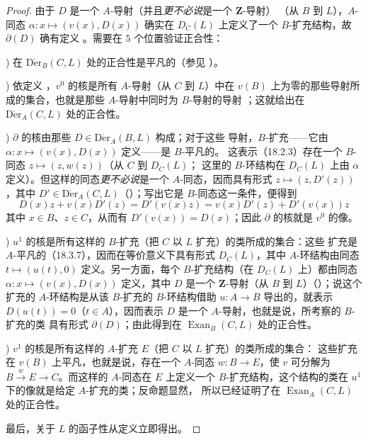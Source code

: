 \begin{proof}
由于 $D$ 是一个 $A$-导射（并且\emph{更不必说}是一个 $\mathbf{Z}$-导射）
（从 $B$ 到 $L$），$A$-同态 $\alpha:x\mapsto(v(x),D(x))$ 确实在
$D_C(L)$ 上定义了一个 $B$-扩充结构，故 $\partial(D)$ 确有定义
。需要在 $5$ 个位置验证正合性：

\medskip
{})\enspace
在 $\operatorname{D\acute{e}r}_B(C,L)$ 处的正合性是平凡的（参见
）。

\medskip
{})\enspace
依定义 ，$v^0$ 的核是所有 $A$-导射（从 $C$ 到 $L$）中在
$v(B)$ 上为零的那些导射所成的集合，也就是那些 $A$-导射中同时为 $B$-导射的导射
；这就给出在 $\operatorname{D\acute{e}r}_A(C,L)$ 处的正合性。

\medskip
{})\enspace
$\partial$ 的核由那些 $D\in\operatorname{D\acute{e}r}_A(B,L)$ 构成；对于这些
导射，$B$-扩充——它由 $\alpha:x\mapsto(v(x),D(x))$ 定义——是 $B$-平凡的。
这表示（18.2.3）存在一个 $B$-同态 $z\mapsto(z,w(z))$（从 $C$ 到 $D_C(L)$；
这里的 $B$-环结构在 $D_C(L)$ 上由 $\alpha$ 定义）。但这样的同态\emph{更不必说}是一个
$A$-同态，因而具有形式 $z\mapsto(z,D'(z))$，其中
$D'\in\operatorname{D\acute{e}r}_A(C,L)$（）；写出它是
$B$-同态这一条件，便得到
\[
  D(x)z+v(x)D'(z)=D'(v(x)z)=v(x)D'(z)+D'(v(x))z
\]
其中 $x\in B$、$z\in C$，从而有 $D'(v(x))=D(x)$；因此 $\partial$ 的核就是
$v^0$ 的像。

\medskip
{})\enspace
$u^1$ 的核是所有这样的 $B$-扩充（把 $C$ 以 $L$ 扩充）的类所成的集合：这些
扩充是 $A$-平凡的（18.3.7），因而在等价意义下具有形式 $D_C(L)$，其中
$A$-环结构由同态 $t\mapsto(u(t),0)$ 定义。另一方面，每个 $B$-扩充结构（在
$D_C(L)$ 上）都由同态 $\alpha:x\mapsto(v(x),D(x))$ 定义，其中 $D$ 是一个
$\mathbf{Z}$-导射（从 $B$ 到 $L$）（）；说这个扩充的
$A$-环结构是从该 $B$-扩充的 $B$-环结构借助 $u:A\to B$ 导出的，就表示
$D(u(t))=0$（$t\in A$），因而表示 $D$ 是一个 $A$-导射，也就是说，所考察的
$B$-扩充的类
具有形式 $\partial(D)$；由此得到在 $\operatorname{Exan}_B(C,L)$ 处的正合性。

\medskip
{})\enspace
$v^1$ 的核是所有这样的 $A$-扩充 $E$（把 $C$ 以 $L$ 扩充）的类所成的集合：
这些扩充在 $v(B)$ 上平凡，也就是说，存在一个 $A$-同态 $w:B\to E$，使 $v$
可分解为 $B\xrightarrow{w}E\to C$。而这样的 $A$-同态在 $E$ 上定义一个
$B$-扩充结构，这个结构的类在 $u^1$ 下的像就是给定 $A$-扩充的类；反命题显然，
所以已经证明了在 $\operatorname{Exan}_A(C,L)$ 处的正合性。

最后，关于 $L$ 的函子性从定义立即得出。
\end{proof}


